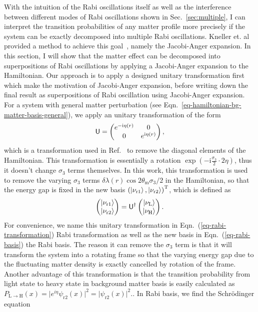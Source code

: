 With the intuition of the Rabi oscillations itself as well as the interference between different modes of Rabi oscillations shown in Sec.~\ref{sec:multiple}, I can interpret the transition probabilities of any matter profile more precisely if the system can be exactly decomposed into multiple Rabi oscillations. Kneller et. al provided a method to achieve this goal~\cite{Kneller2013}, namely the Jacobi-Anger expansion. In this section, I will show that the matter effect can be decomposed into superpositions of Rabi oscillations by applying a Jacobi-Anger expansion to the Hamiltonian. Our approach is to apply a designed unitary transformation first which make the motivation of Jacobi-Anger expansion, before writing down the final result as superpositions of Rabi oscillation using Jacobi-Anger expansion. For a system with general matter perturbation (see Eqn.~\ref{eq-hamiltonian-bg-matter-basis-general}), we apply an unitary transformation of the form
\begin{equation}
    \mathsf{U} =  \begin{pmatrix} e^{-\ri \eta (r)} & 0 \\  0 & e^{\mathrm i \eta (r)}  \end{pmatrix},
    \label{eq-rabi-transformation}
\end{equation}
which is a transformation used in Ref.~\cite{Kneller2006} to remove the diagonal elements of the Hamiltonian. This transformation is essentially a rotation $\exp\left(-\mathrm i\frac{\sigma_3}{2}\cdot 2\eta\right)$, thus it doesn't change $
\sigma_3$ terms themselves. In this work, this transformation is used to remove the varying $\sigma_3$ terms $\delta\lambda(r) \cos 2\theta_{\mathrm m} \sigma_3/2$ in the Hamiltonian, so that the energy gap is fixed in the new basis $\left(\left| \nu_{\mathrm{r1}}\right\rangle,\left| \nu_{\mathrm{r2}}\right\rangle\right)^{\mathrm{T}}$, which is defined as
\begin{equation}
    \begin{pmatrix} \ket{\nu_{\mathrm{r1}}}\\ \ket{\nu_{\mathrm{r2}}} \end{pmatrix} =  \mathsf{U}^\dagger \begin{pmatrix} \ket{\nu_{\mathrm{L}}} \\ \ket{\nu_{\mathrm{H}}} \end{pmatrix}.
    \label{eq-rabi-basis}
\end{equation}
For convenience, we name this unitary transformation in Eqn.~(\ref{eq-rabi-transformation}) Rabi transformation as well as the new basis in Eqn.~(\ref{eq-rabi-basis}) the Rabi basis. The reason it can remove the $\sigma_3$ term is that it will transform the system into a rotating frame so that the varying energy gap due to the fluctuating matter density is exactly cancelled by rotation of the frame. Another advantage of this transformation is that the transition probability from light state to heavy state in background matter basis is easily calculated as $P_{\mathrm{L} \to
\mathrm{H}} (x) = \lvert e^{i\eta} \psi_{\mathrm r2} (x)  \rvert^2 = \lvert \psi_{\mathrm r2} (x)  \rvert^2 .$. In Rabi basis, we find the Schr\"{o}dinger equation

